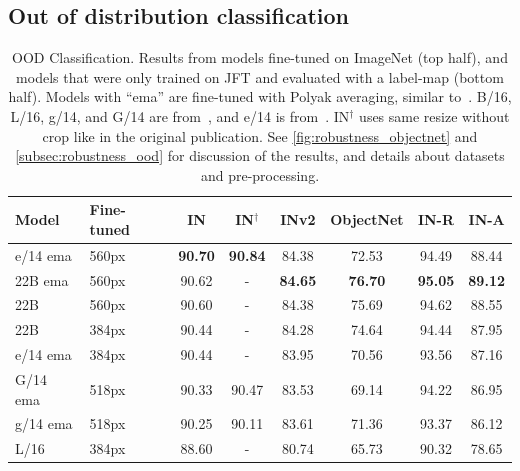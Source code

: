 
\subsection{Out of distribution classification}
\label{app:ood}

\begin{table}[th]
    \caption{
        OOD Classification. Results from models fine-tuned on ImageNet (top half), and models that were only trained on JFT and evaluated with a label-map (bottom half).
        Models with ``ema'' are fine-tuned with Polyak averaging, similar to~\citep{dosovitskiy2020image}.
        B/16, L/16, g/14, and G/14 are from~\citep{zhai2022scaling}, and e/14 is from~\citep{chen2022pali}.
        IN$^\dagger$ uses same resize without crop like in the original publication.
        See \cref{fig:robustness_objectnet} and \cref{subsec:robustness_ood} for discussion of the results, and details about datasets and pre-processing.
    }
    \centering
    \setlength{\tabcolsep}{5pt}
    \begin{tabular}{@{} l l c c c c c c @{}}
        \toprule
        Model & Fine-tuned & IN & IN$^\dagger$ & INv2 & ObjectNet & IN-R & IN-A \\
        \midrule
        e/14 ema & 560px &   \textbf{90.70} & \textbf{90.84} &  84.38 &     72.53 & 94.49 & 88.44 \\
        22B ema & 560px &   90.62 &              - &  \textbf{84.65} &     \textbf{76.70} & \textbf{95.05} & \textbf{89.12} \\
        22B & 560px &   90.60 & - &  84.38 &     75.69 & 94.62 & 88.55 \\
        22B & 384px &   90.44 & - &  84.28 &     74.64 & 94.44 & 87.95 \\
        e/14 ema & 384px &   90.44 & - &  83.95 &     70.56 & 93.56 & 87.16 \\
        G/14 ema & 518px &   90.33 & 90.47 &  83.53 &     69.14 & 94.22 & 86.95 \\
        g/14 ema & 518px &   90.25 & 90.11 &  83.61 &     71.36 & 93.37 & 86.12 \\
        L/16 & 384px &   88.60 & - &  80.74 &     65.73 & 90.32 & 78.65 \\

\end{tabular}
\end{table}
